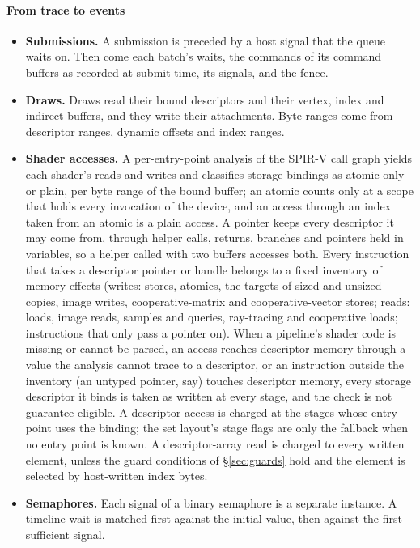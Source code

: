\documentclass[acmtog,anonymous,review]{acmart}
\begin{document}
\paragraph{From trace to events}
\begin{itemize}
\item \textbf{Submissions.} A submission is preceded by a host signal that the queue waits on. Then come each
  batch's waits, the commands of its command buffers as recorded at submit time, its signals, and the fence.
\item \textbf{Draws.} Draws read their bound descriptors and their vertex, index and indirect buffers, and they
  write their attachments. Byte ranges come from descriptor ranges, dynamic offsets and index ranges.
\item \textbf{Shader accesses.} A per-entry-point analysis of the SPIR-V call graph yields each shader's reads and
  writes and classifies storage bindings as atomic-only or plain, per byte range of the bound buffer; an atomic
  counts only at a scope that holds every invocation of the device, and an access through an index taken from an
  atomic is a plain access. A pointer keeps every descriptor it may come from, through helper calls, returns, branches
  and pointers held in variables, so a helper called with two buffers accesses both. Every instruction that takes a
  descriptor pointer or handle belongs to a fixed inventory of memory effects (writes: stores, atomics, the targets of
  sized and unsized copies, image writes, cooperative-matrix and cooperative-vector stores; reads: loads, image reads,
  samples and queries, ray-tracing and cooperative loads; instructions that only pass a pointer on). When a
  pipeline's shader code is missing or cannot be parsed, an access reaches descriptor memory through a value the
  analysis cannot trace to a descriptor, or an instruction outside the inventory (an untyped pointer, say) touches
  descriptor memory, every storage descriptor it binds is taken as written at every stage, and the check is not
  guarantee-eligible. A descriptor access is
  charged at the stages whose entry point uses the binding; the set layout's stage flags are only the fallback when no
  entry point is known. A descriptor-array read is charged to every written element, unless the guard conditions of
  \S\ref{sec:guards} hold and the element is selected by host-written index bytes.
\item \textbf{Semaphores.} Each signal of a binary semaphore is a separate instance. A timeline wait is matched
  first against the initial value, then against the first sufficient signal.

\end{itemize}
\end{document}
